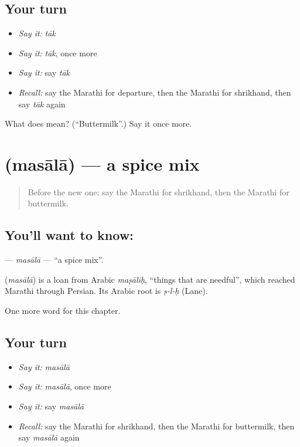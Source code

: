 \subsection*{Your turn}
\begin{itemize}
\raggedright
  \item \emph{Say it:} \emph{tāk}
  \item \emph{Say it:} \emph{tāk}, once more
  \item \emph{Say it:} say \emph{tāk}
  \item \emph{Recall:} say the Marathi for departure, then the Marathi for shrikhand, then say \emph{tāk} again
\end{itemize}

\begin{tcolorbox}[breakable,colback=teal!4,colframe=teal!35!black,title={Before you move on}]
What does  mean? (\textquotedblleft{}Buttermilk\textquotedblright{}.) Say it once more.
\end{tcolorbox}
\section[\texorpdfstring{\mr{मसाला} (masālā)}{मसाला (masālā)}]{ (masālā) — a spice mix}

\label{lesson:MR-C216-masala}



\begin{quote}
Before the new one: say the Marathi for shrikhand, then the Marathi for buttermilk.
\end{quote}

\subsection*{You'll want to know: }
\textbf{} — \emph{masālā} — \textquotedblleft{}a spice mix\textquotedblright{}.

\begin{cousinweb}
\textbf{} (\emph{masālā}) is a loan from Arabic \emph{maṣāliḥ}, \textquotedblleft{}things that are needful\textquotedblright{}, which reached Marathi through Persian. Its Arabic root is \emph{ṣ-l-ḥ} (Lane).
\end{cousinweb}

\begin{grammarlens}[title={What you've built}]
One more word for this chapter.
\end{grammarlens}

\subsection*{Your turn}
\begin{itemize}
\raggedright
  \item \emph{Say it:} \emph{masālā}
  \item \emph{Say it:} \emph{masālā}, once more
  \item \emph{Say it:} say \emph{masālā}
  \item \emph{Recall:} say the Marathi for shrikhand, then the Marathi for buttermilk, then say \emph{masālā} again
\end{itemize}

